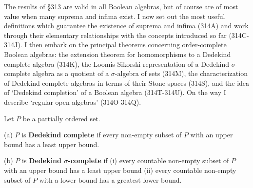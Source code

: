 
\def\chaptername{Boolean algebras}
\def\sectionname{Order-completeness}


The results of \S313 are valid in all Boolean algebras, but
of course are of most value when many suprema and infima exist.
I now set out the most useful definitions which guarantee the existence
of suprema and infima (314A) and work through their elementary
relationships with the concepts introduced so far (314C-314J).   I then
embark on the principal theorems concerning order-complete Boolean
algebras:  the extension theorem for homomorphisms to a Dedekind
complete algebra (314K), the Loomis-Sikorski representation of a
Dedekind $\sigma$-complete algebra as a quotient of a $\sigma$-algebra
of sets (314M), the characterization of Dedekind complete algebras in
terms of their Stone spaces (314S), and the idea of `Dedekind
completion' of a Boolean algebra (314T-314U).
On the way I describe `regular open algebras' (314O-314Q).

  Let $P$ be a partially ordered set.

(a) $P$ is {\bf Dedekind complete} if every
non-empty subset of $P$ with an upper bound has a least upper bound.

(b) $P$ is {\bf Dedekind $\sigma$-complete} if (i) every countable non-empty subset
of $P$ with an upper bound has a least upper bound (ii) every countable
non-empty subset of $P$ with a lower bound has a greatest lower bound.

